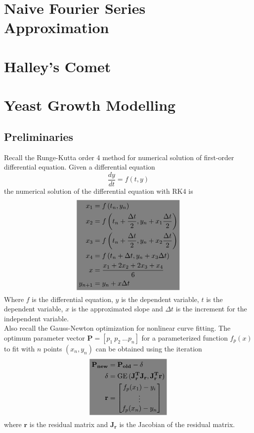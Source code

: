 \documentclass[10pt, twocolumn]{article}
\newcommand{\highlight}[1]{\colorbox{gray}{$\displaystyle#1$}}
\DeclareMathOperator{\GE}{GE}
\begin{document}
	\section{Naive Fourier Series Approximation}
	\section{Halley's Comet}
	\section{Yeast Growth Modelling}
	\subsection{Preliminaries}
	Recall the Runge-Kutta order 4 method for numerical solution of first-order differential equation. Given a differential equation
	$$\frac{dy}{dt} = f(t, y)
	$$
	the numerical solution of the differential equation with RK4 is
	\begin{equation}
	\highlight{
		\begin{aligned}
			x_1 &= f\left(t_n, y_n\right)\\
			x_2 &= f\left(t_n + \frac{\Delta t}{2}, y_n + x_1 \frac{\Delta t}{2}\right)\\
			x_3 &= f\left(t_n + \frac{\Delta t}{2}, y_n + x_2 \frac{\Delta t}{2}\right)\\
			x_4 &= f\left(t_n + \Delta t, y_n + x_3 \Delta t\right)\\
			x &= \frac{x_1+2x_2+2x_3+x_4}{6}\\
			y_{n+1} &= y_n + x\Delta t
		\end{aligned}
	}
	\end{equation}
	Where $f$ is the differential equation, $y$ is the dependent variable, $t$ is the dependent variable, $x$ is the approximated slope and $\Delta t$ is the increment for the independent variable.\\
	Also recall the Gauss-Newton optimization for nonlinear curve fitting. 
	The optimum parameter vector $\mathbf{P}=[p_1\:p_2\:...p_n]$ for a parameterized function $f_p(x)$ to fit with $n$ points $(x_n, y_n)$ can be obtained using the iteration
	\begin{equation}
	\highlight{
		\begin{aligned}
			\mathbf{P_{new}} &= \mathbf{P_{old}} - \delta\\
			\delta &= \GE\mathbf{(J_r^TJ_r, J_r^Tr)}\\
			\mathbf{r} &= 
				\begin{bmatrix}
					f_p(x_1)-y_i\\
					\vdots\\
					f_p(x_n)-y_n\\
				\end{bmatrix}
		\end{aligned}
	}
	\end{equation}
	where $\mathbf{r}$ is the residual matrix and $\mathbf{J_r}$ is the Jacobian of the residual matrix.
	
\end{document}
